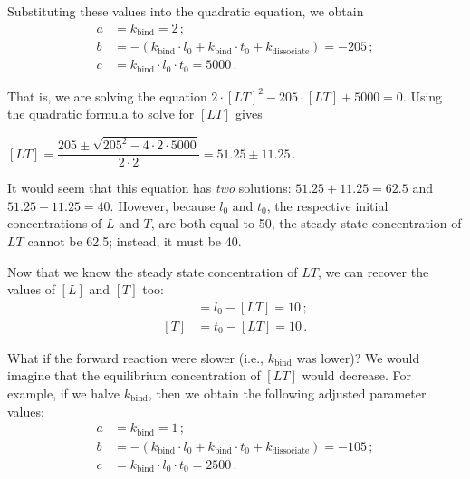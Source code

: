 
\noindent Substituting these values into the quadratic equation, we obtain
\begin{align*}
a & = k_\text{bind} = 2\,;\\
b & = - (k_\text{bind} \cdot l_0 + k_\text{bind} \cdot t_0 + k_\text{dissociate}) = -205\,;\\
c & = k_\text{bind} \cdot l_0 \cdot t_0 = 5000\,.
\end{align*}

\noindent That is, we are solving the equation $2 \cdot [LT]^2 - 205 \cdot [LT] + 5000 = 0$. Using the quadratic formula to solve for $[LT]$ gives

\begin{center}
$[LT] = \dfrac{205 \pm \sqrt{205^2 - 4 \cdot 2 \cdot 5000}}{2 \cdot 2} = 51.25 \pm 11.25$\,.
\end{center}

It would seem that this equation has \textit{two} solutions: $51.25 + 11.25 = 62.5$ and $51.25 - 11.25 = 40$. However, because $l_0$ and $t_0$, the respective initial concentrations of $L$ and $T$, are both equal to 50, the steady state concentration of $LT$ cannot be 62.5; instead, it must be 40.

Now that we know the steady state concentration of $LT$, we can recover the values of $[L]$ and $[T]$ too:
\begin{align*}
[L] & = l_0 - [LT] = 10\,;\\
[T] & = t_0 - [LT] = 10\,.
\end{align*}

What if the forward reaction were slower (i.e., $k_\text{bind}$ was lower)? We would imagine that the equilibrium concentration of $[LT]$ would decrease. For example, if we halve $k_\text{bind}$, then we obtain the following adjusted parameter values:
\begin{align*}
a & = k_\text{bind} = 1\,;\\
b & = - (k_\text{bind} \cdot l_0 + k_\text{bind} \cdot t_0 + k_\text{dissociate}) = -105\,;\\
c & = k_\text{bind} \cdot l_0 \cdot t_0 = 2500\,.
\end{align*}

